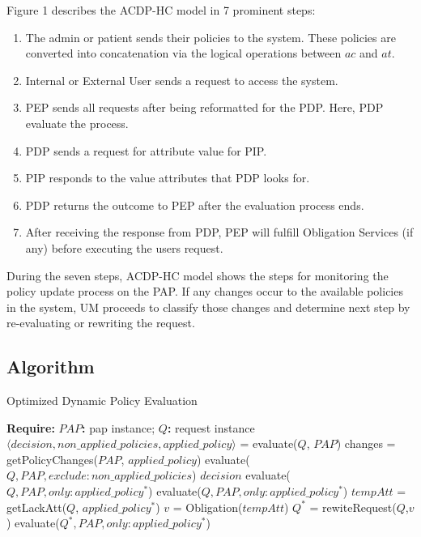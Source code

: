 Figure 1 describes the ACDP-HC model in 7 prominent steps:
\begin{enumerate}
  \item The admin or patient sends their policies to the system. These policies are converted into concatenation via the logical operations between $ac$ and $at$.
  \item Internal or External User sends a request to access the system. 
  \item PEP sends all requests after being reformatted for the PDP. Here, PDP evaluate the process.
  \item PDP sends a request for attribute value for PIP.
  \item PIP responds to the value attributes that PDP looks for.
  \item PDP returns the outcome to PEP after the evaluation process ends.
  \item After receiving the response from PDP, PEP will fulfill Obligation Services (if any) before executing the users request.
\end{enumerate}

During the seven steps, ACDP-HC model shows the steps for monitoring the policy update process on the PAP. 
If any changes occur to the available policies in the system, UM proceeds to classify those changes and determine next step by re-evaluating or rewriting the request. 

\subsection{Algorithm}\label{Al}

\begin{algorithm}
  \caption{Optimized Dynamic Policy Evaluation}
  \label{alg:optimized}
  \fontsize{9pt}{12pt}\selectfont
  \begin{algorithmic}[1]
    \item \textbf{Require:} \textbf{$PAP$:} pap instance; \textbf{$Q$:} request instance\\
    $\langle decision, non\_applied\_policies, applied\_policy \rangle$ = evaluate($Q$, $PAP$)
    \State changes = getPolicyChanges($PAP$, $applied\_policy$)
        \State \Return evaluate($Q, PAP, exclude: non\_applied\_policies$)
      \EndCase
        \State \Return $decision$
      \EndCase
        \State \Return evaluate($Q, PAP, only: applied\_policy^*$)
        \State \Return evaluate($Q, PAP, only: applied\_policy^*$)
        \State $tempAtt$ = getLackAtt($Q$, $applied\_policy^*$)
        \State  $v$ = Obligation($tempAtt$)
        \State  $Q^*$ = rewiteRequest($Q$,$v$)
        \State \Return evaluate($Q^*, PAP, only: applied\_policy^*$)
        \EndIf
      \EndCase
    \EndSwitch
  \end{algorithmic}
\end{algorithm}

